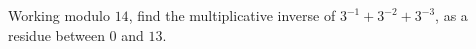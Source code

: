 Working modulo $14$, find the multiplicative inverse of $3^{-1}+3^{-2}+3^{-3}$, as a residue between $0$ and $13$.
